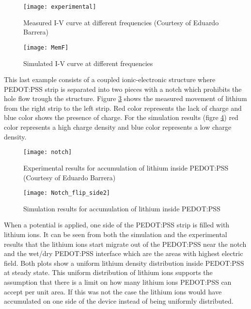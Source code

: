 \begin{doublespace}
\begin{figure}[!htp]
\centering
\texttt{[image: experimental]}
\caption{Measured I-V curve at different frequencies (Courtesy of Eduardo Barrera)\cite{eduardo2}} 
\label{experimental}
\end{figure}

\begin{figure}[!htp]
\centering
\texttt{[image: MemF]}
\caption{Simulated I-V curve at different frequencies } 
\label{MemF}
\end{figure}

\clearpage
This last example consists of a coupled ionic-electronic structure where PEDOT:PSS strip is separated into two pieces with a notch which prohibits the hole flow trough the structure. Figure \ref{notch} shows the measured movement of lithium from the right strip to the left strip. Red color represents the lack of charge and blue color shows the presence of charge. For the simulation results (figre \ref{Notch_flip_side}) red color represents a high charge density and blue color represents a low charge density.

\begin{figure}[!htp]
\centering
\texttt{[image: notch]}
\caption{Experimental results for accumulation of lithium inside PEDOT:PSS (Courtesy of Eduardo Barrera)\cite{eduardo2}} 
\label{notch}
\end{figure}

\begin{figure}[!htp]
\centering
\texttt{[image: Notch\_flip\_side2]}
\caption{Simulation results for accumulation of lithium inside PEDOT:PSS} 
\label{Notch_flip_side}
\end{figure}

When a potential is applied, one side of the PEDOT:PSS strip is filled with lithium ions. It can be seen from both the simulation and the experimental results that the lithium ions start migrate out of the PEDOT:PSS near the notch and the wet/dry PEDOT:PSS interface which are the areas with highest electric field. Both plots show a uniform lithium density distribution inside PEDOT:PSS at steady state. This uniform distribution of lithium ions supports the assumption that there is a limit on how many lithium ions PEDOT:PSS can accept per unit area. If this was not the case the lithium ions would have accumulated on one side of the device instead of being uniformly distributed.


\end{doublespace}

